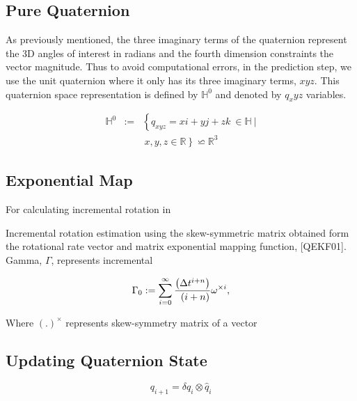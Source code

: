 \documentclass[letterpaper, 10 pt, conference]{ieeeconf}  %
\begin{document}
\subsection{Pure Quaternion}
As previously mentioned, the three imaginary terms of the quaternion represent the
3D angles of interest in radians and the fourth dimension constraints the vector
magnitude. Thus to avoid computational errors, in the prediction step, we use
the unit quaternion where it only has its three imaginary terms, $xyz$.
This quaternion space representation is defined by $\mathbb{H}^{0}$ and
denoted by $q_xyz$ variables.



\begin{eqnarray}\nonumber
\label{eq:13}
\mathbb{H}^{0} &:=& \left\{ q_{xyz}=xi+yj+zk~ \in \mathbb{H}~| \right.\\
&& \left. ~x,y,z \in \mathbb{R} \right\} \backsimeq  \mathbb{R}^3
\end{eqnarray}



\subsection{Exponential Map}

For calculating incremental rotation in

Incremental rotation estimation using the skew-symmetric matrix obtained form
the rotational rate vector and matrix exponential mapping function, [QEKF01].
Gamma, $\Gamma$, represents incremental

\begin{equation}
\label{eq:14}
\Gamma_{0} := \sum_{i=0}^{\infty} \frac{ \left( \Delta t^{i+n}  \right)}{ \\
\left( i + n \right) \! } \\
\omega^{\times i},
\end{equation}

Where $(.)^{\times}$ represents skew-symmetry matrix of a vector


\subsection{Updating Quaternion State}
\begin{equation}
\label{eq:15}
q_{i+1} = \delta q_{i} \otimes \widehat{q}_{i}
\end{equation}
\end{document}
